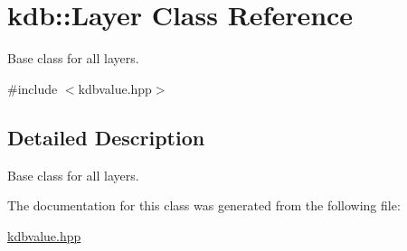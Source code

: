 \hypertarget{classkdb_1_1Layer}{\section{kdb\+:\+:Layer Class Reference}
\label{classkdb_1_1Layer}
}


Base class for all layers.  




{\ttfamily \#include $<$kdbvalue.\+hpp$>$}



\subsection{Detailed Description}
Base class for all layers. 

The documentation for this class was generated from the following file\+:\begin{DoxyCompactItemize}
\item 
\hyperlink{kdbvalue_8hpp}{kdbvalue.\+hpp}\end{DoxyCompactItemize}
